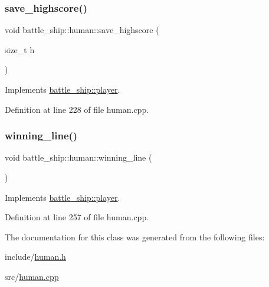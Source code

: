 \subsubsection{\texorpdfstring{save\+\_\+highscore()}{save\_highscore()}}
{\footnotesize\ttfamily void battle\+\_\+ship\+::human\+::save\+\_\+highscore (\begin{DoxyParamCaption}\item[{size\+\_\+t}]{h }\end{DoxyParamCaption})\hspace{0.3cm}{\ttfamily [virtual]}}



Implements \hyperlink{classbattle__ship_1_1player_a928538249678aea5402f8c673671e995}{battle\+\_\+ship\+::player}.



Definition at line 228 of file human.\+cpp.

\mbox{\label{classbattle__ship_1_1human_a583d0a9dd05c16f700d0d1825916faa3}} 
\subsubsection{\texorpdfstring{winning\+\_\+line()}{winning\_line()}}
{\footnotesize\ttfamily void battle\+\_\+ship\+::human\+::winning\+\_\+line (\begin{DoxyParamCaption}{ }\end{DoxyParamCaption})\hspace{0.3cm}{\ttfamily [virtual]}}



Implements \hyperlink{classbattle__ship_1_1player_a3110ec708fd8fc7e02a6e88a63d57d2f}{battle\+\_\+ship\+::player}.



Definition at line 257 of file human.\+cpp.



The documentation for this class was generated from the following files\+:\begin{DoxyCompactItemize}
\item 
include/\hyperlink{human_8h}{human.\+h}\item 
src/\hyperlink{human_8cpp}{human.\+cpp}\end{DoxyCompactItemize}
